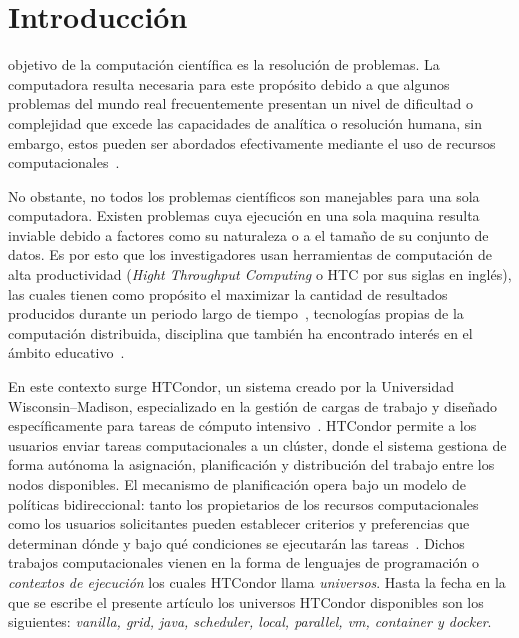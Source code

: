 \section{Introducción}
 objetivo de la computación científica es la resolución
de problemas. La computadora resulta necesaria para este propósito debido a
que algunos problemas del mundo real frecuentemente presentan un nivel de dificultad
o complejidad que excede las capacidades de analítica o resolución humana, sin embargo,
estos pueden ser abordados efectivamente mediante el uso
de recursos computacionales~\cite{landau01}.


No obstante, no todos los problemas científicos son
manejables para una sola computadora. Existen problemas cuya ejecución en una sola maquina resulta
inviable debido a factores como su naturaleza o a el tamaño de su conjunto de datos. Es por esto
que los investigadores usan herramientas de computación de alta productividad
(\textit{Hight Throughput Computing} o HTC por sus siglas en inglés), las cuales tienen como
propósito el maximizar la cantidad de resultados producidos durante un periodo
largo de tiempo~\cite{juve-01},
tecnologías propias de la computación distribuida, disciplina que también
ha encontrado interés en el ámbito educativo~\cite{Senol-01}.

En este contexto surge HTCondor, un sistema creado por la
Universidad Wisconsin–Madison, especializado en la gestión de cargas
de trabajo y diseñado específicamente para tareas de cómputo intensivo~\cite{chang-01, htcondor-description}.
HTCondor permite a los usuarios enviar tareas computacionales a un clúster,
donde el sistema gestiona de forma autónoma la asignación, planificación y distribución del
trabajo entre los nodos disponibles. El mecanismo de planificación opera bajo un
modelo de políticas bidireccional: tanto los propietarios de los recursos computacionales
como los usuarios solicitantes pueden establecer criterios y preferencias
que determinan dónde y bajo qué condiciones se ejecutarán las tareas~\cite{htcondor-description}.
Dichos trabajos computacionales vienen en la forma de lenguajes de programación
o \textit{contextos de ejecución} los cuales HTCondor llama
\textit{universos}. Hasta la fecha en la que se escribe el presente artículo
los universos HTCondor disponibles son los siguientes: \textit{vanilla, grid, java, scheduler,
	local, parallel, vm, container y docker}.


